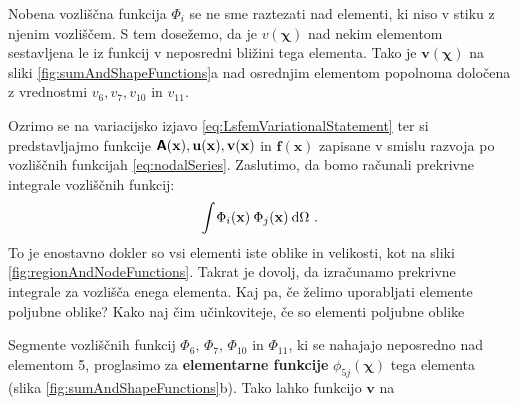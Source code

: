 Nobena vozliščna funkcija $\Phi_i$ se ne sme raztezati nad elementi, ki niso v stiku z njenim vozliščem. S tem dosežemo, da je $v(\bm\chi)$ nad nekim elementom sestavljena le iz funkcij v neposredni bližini tega elementa. Tako je $\mathbf{v}(\bm\chi)$ na sliki \ref{fig:sumAndShapeFunctions}a nad osrednjim elementom popolnoma določena z vrednostmi $v_6, v_7, v_{10}$ in $v_{11}$.

Ozrimo se na variacijsko izjavo \eqref{eq:LsfemVariationalStatement} ter si predstavljajmo funkcije $\bm{\mathsf{A}}(\mathbf{x}), \mathbf{u(x)}, \mathbf{v(x)}$ in $\mathbf{f(x)}$ zapisane v smislu razvoja po vozliščnih funkcijah \eqref{eq:nodalSeries}. Zaslutimo, da bomo računali prekrivne integrale vozliščnih funkcij:
\begin{equation}
    \int \mkern-2mu \Phi_i(\mathbf{x}) \mkern4mu \Phi_j(\mathbf{x}) \mkern4mu \mathrm{d} \Omega \ .
\end{equation}
To je enostavno dokler so vsi elementi iste oblike in velikosti, kot na sliki \ref{fig:regionAndNodeFunctions}. Takrat je dovolj, da izračunamo prekrivne integrale za vozlišča enega elementa. Kaj pa, če želimo uporabljati elemente poljubne oblike? Kako naj čim učinkoviteje, če so elementi poljubne oblike

 Segmente vozliščnih funkcij $\Phi_6, \, \Phi_7, \, \Phi_{10}$ in $\Phi_{11}$, ki se nahajajo neposredno nad elementom 5, proglasimo za \textbf{elementarne funkcije} $\phi_{5 j}(\bm\chi)$ tega elementa (slika \ref{fig:sumAndShapeFunctions}b). Tako lahko funkcijo $\mathbf{v}$ na

